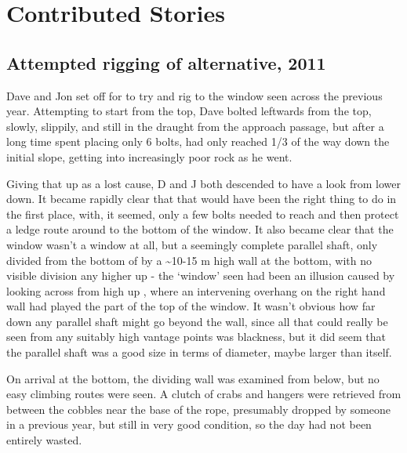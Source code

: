 
\section{Contributed Stories}


\subsection{\texorpdfstring{Attempted rigging of  alternative,
2011}{Attempted rigging of Big Rock Candy Mountain alternative, 2011}}

Dave and Jon set off for to try and rig to the window seen across
 the previous year. Attempting to start
from the top, Dave bolted leftwards from the top, slowly, slippily, and
still in the draught from the approach passage, but after a long time
spent placing only 6 bolts, had only reached 1/3 of the way down the
initial slope, getting into increasingly poor rock as he went.

Giving that up as a lost cause, D and J both descended  to have a look from lower down. It became rapidly clear
that that would have been the right thing to do in the first place,
with, it seemed, only a few bolts needed to reach and then protect a
ledge route around to the bottom of the window. It also became clear
that the window wasn't a window at all, but a seemingly complete
parallel shaft, only divided from the bottom of  by a \textasciitilde 10-15 m high wall at the bottom, with no
visible division any higher up - the `window' seen had been an illusion
caused by looking across from high up ,
where an intervening overhang on the right hand wall had played the part
of the top of the window. It wasn't obvious how far down any parallel
shaft might go beyond the wall, since all that could really be seen from
any suitably high vantage points was blackness, but it did seem that the
parallel shaft was a good size in terms of diameter, maybe larger than
 itself.

On arrival at the bottom, the dividing wall was examined from below, but
no easy climbing routes were seen. A clutch of crabs and hangers were
retrieved from between the cobbles near the base of the rope, presumably
dropped by someone in a previous year, but still in very good condition,
so the day had not been entirely wasted.



